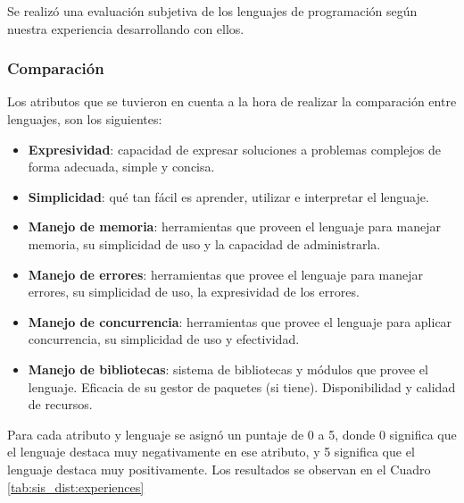 \documentclass[11pt]{article}
\let\Oldsubsubsection\subsubsection
\renewcommand{\subsubsection}{\FloatBarrier\Oldsubsubsection}
\begin{document}
Se realizó una evaluación subjetiva de los lenguajes de programación según nuestra experiencia desarrollando con ellos.

\subsubsection{Comparación} \label{sec:subjective_comparison}

Los atributos que se tuvieron en cuenta a la hora de realizar la comparación entre lenguajes, son los siguientes:

\begin{itemize}
    \item \textbf{Expresividad}: capacidad de expresar soluciones a problemas complejos de forma adecuada, simple y concisa.
    \item \textbf{Simplicidad}: qué tan fácil es aprender, utilizar e interpretar el lenguaje.
    \item \textbf{Manejo de memoria}: herramientas que proveen el lenguaje para manejar memoria, su simplicidad de uso y la capacidad de administrarla.
    \item \textbf{Manejo de errores}: herramientas que provee el lenguaje para manejar errores, su simplicidad de uso, la expresividad de los errores.
    \item \textbf{Manejo de concurrencia}: herramientas que provee el lenguaje para aplicar concurrencia, su simplicidad de uso y efectividad.
    \item \textbf{Manejo de bibliotecas}: sistema de bibliotecas y módulos que provee el lenguaje. Eficacia de su gestor de paquetes (si tiene). Disponibilidad y calidad de recursos.
\end{itemize}

Para cada atributo y lenguaje se asignó un puntaje de 0 a 5, donde 0 significa que el lenguaje destaca muy negativamente en ese atributo, y 5 significa que el lenguaje destaca muy positivamente. Los resultados se observan en el Cuadro \ref{tab:sis_dist:experiences}
\end{document}
